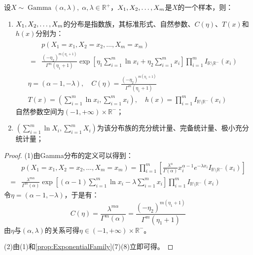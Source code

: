 \begin{theorem}
	设$X\sim\operatorname{Gamma}(\alpha,\lambda),\;\alpha,\lambda\in\mathbb{R}^{+}$，$X_1, X_2, \dots, X_{m}$是$X$的一个样本，则：
	\begin{enumerate}
		\item $X_1, X_2, \dots, X_{m}$的分布是指数族，其标准形式、自然参数、$C(\eta)$、$T(x)$和$h(x)$分别为：
		\begin{gather*}
			\begin{aligned}
				&p(X_1=x_1,X_2=x_2,\dots,X_m=x_m) \\
				=&\frac{(-\eta_2)^{m(\eta_1+1)}}{\Gamma^m(\eta_1+1)}\exp\left[\eta_1\sum_{i=1}^{m}\ln x_i+\eta_2\sum_{i=1}^{m}x_i\right]\prod_{i=1}^{m}I_{\mathbb{R}\setminus\mathbb{R}^{-}}(x_i)
			\end{aligned} \\
			\eta=(\alpha-1,-\lambda),\quad C(\eta)=\frac{(-\eta_2)^{m(\eta_1+1)}}{\Gamma^m(\eta_1+1)} \\
			T(x)=\left(\sum_{i=1}^{m}\ln x_i,\sum_{i=1}^{m}x_i\right),\quad h(x)=\prod_{i=1}^{m}I_{\mathbb{R}\setminus\mathbb{R}^{-}}(x_i)
		\end{gather*}
		自然参数空间为$(-1,+\infty)\times\mathbb{R}^{-}$；
		\item $\left(\sum\limits_{i=1}^{m}\ln X_i,\sum\limits_{i=1}^{m}X_i\right)$为该分布族的充分统计量、完备统计量、极小充分统计量；
	\end{enumerate}
\end{theorem}
\begin{proof}
	(1)由Gamma分布的定义可以得到：
	\begin{align*}
		&p(X_1=x_1,X_2=x_2,\dots,X_m=x_m)=\prod_{i=1}^{m}\left[\frac{\lambda^{\alpha}}{\Gamma(\alpha)}x_i^{\alpha-1}e^{-\lambda x_i}I_{\mathbb{R}\setminus\mathbb{R}^{-}}(x_i)\right] \\
		=&\frac{\lambda^{m\alpha}}{\Gamma^m(\alpha)}\exp\left[(\alpha-1)\sum_{i=1}^{m}\ln x_i-\lambda\sum_{i=1}^{m}x_i\right]\prod_{i=1}^{m}I_{\mathbb{R}\setminus\mathbb{R}^{-}}(x_i)
	\end{align*}
	令$\eta=(\alpha-1,-\lambda)$，于是有：
	\begin{equation*}
		C(\eta)=\frac{\lambda^{m\alpha}}{\Gamma^m(\alpha)}=\frac{(-\eta_2)^{m(\eta_1+1)}}{\Gamma^m(\eta_1+1)}
	\end{equation*}
	由$\eta$与$(\alpha,\lambda)$的关系可得$\eta\in(-1,+\infty)\times\mathbb{R}^{-}$。\par
	(2)由(1)和\cref{prop:ExponentialFamily}(7)(8)立即可得。
\end{proof}

